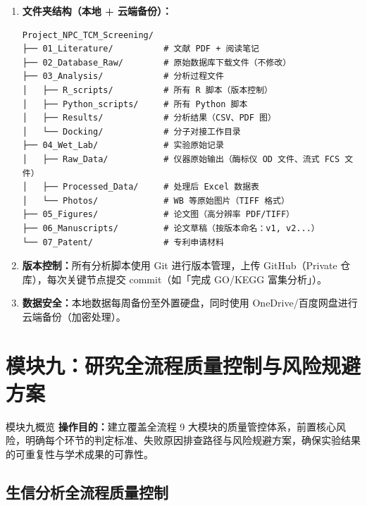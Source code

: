 \documentclass[12pt,a4paper,twoside]{article}
\begin{document}
\begin{enumerate}
  \item \textbf{文件夹结构（本地 + 云端备份）：}
\begin{lstlisting}[language={},caption={标准化数据归档目录结构}]
Project_NPC_TCM_Screening/
├── 01_Literature/          # 文献 PDF + 阅读笔记
├── 02_Database_Raw/        # 原始数据库下载文件（不修改）
├── 03_Analysis/            # 分析过程文件
│   ├── R_scripts/          # 所有 R 脚本（版本控制）
│   ├── Python_scripts/     # 所有 Python 脚本
│   ├── Results/            # 分析结果（CSV、PDF 图）
│   └── Docking/            # 分子对接工作目录
├── 04_Wet_Lab/             # 实验原始记录
│   ├── Raw_Data/           # 仪器原始输出（酶标仪 OD 文件、流式 FCS 文件）
│   ├── Processed_Data/     # 处理后 Excel 数据表
│   └── Photos/             # WB 等原始图片（TIFF 格式）
├── 05_Figures/             # 论文图（高分辨率 PDF/TIFF）
├── 06_Manuscripts/         # 论文草稿（按版本命名：v1, v2...）
└── 07_Patent/              # 专利申请材料
\end{lstlisting}

  \item \textbf{版本控制：}所有分析脚本使用 Git 进行版本管理，上传 GitHub（Private 仓库），每次关键节点提交 commit（如「完成 GO/KEGG 富集分析」）。
  \item \textbf{数据安全：}本地数据每周备份至外置硬盘，同时使用 OneDrive/百度网盘进行云端备份（加密处理）。
\end{enumerate}

\section{模块九：研究全流程质量控制与风险规避方案}
\label{sec:module9}

\begin{infobox}{模块九概览}
\textbf{操作目的：}建立覆盖全流程 9 大模块的质量管控体系，前置核心风险，明确每个环节的判定标准、失败原因排查路径与风险规避方案，确保实验结果的可重复性与学术成果的可靠性。
\end{infobox}

\subsection{生信分析全流程质量控制}
\label{sec:module9_bioinformatics}
\end{document}
